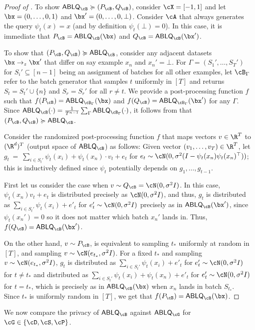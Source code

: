 \documentclass[twoside]{article}
\theoremstyle{definition}
\newcommand{\ABLQ}{\mathsf{ABLQ}}
\newcommand{\ABLQG}{\ABLQ_{\cG}}
\newcommand{\ABLQB}{\ABLQ_{\cB}}
\newcommand{\PB}{P_{\cB}}
\newcommand{\QB}{Q_{\cB}}
\newcommand{\dominates}{\succcurlyeq}%
\begin{document}
\begin{proof}[Proof of ]
To show $\ABLQB \dominates (\PB, \QB)$, consider $\cX = [-1, 1]$ and let $\bx = (0, \ldots, 0, 1)$ and $\bx' = (0, \ldots, 0, \bot)$. Consider
$\cA$ that always generates the query $\psi_t(x) = x$ (and by definition $\psi_t(\bot) = 0$). In this case, it is immediate that $\PB = \ABLQB(\bx)$ and $\QB = \ABLQB(\bx')$.

To show that $(\PB, \QB) \dominates \ABLQB$, consider any adjacent datasets $\bx \to_z \bx'$ that differ on say example $x_n$ and $x_n' = \bot$.
For $\Gamma = (S_1', \ldots, S_T')$ for $S_i' \subseteq [n-1]$ being an assignment of batches for all other examples, let $\cB_{\Gamma}$ refer to the batch generator that samples $t$ uniformly in $[T]$ and returns $S_t = S_t' \cup \{n\}$ and $S_{r} = S_r'$ for all $r \ne t$.
We provide a post-processing function $f$ such that $f(\PB) = \ABLQ_{\cB_{\Gamma}}(\bx)$ and $f(\QB) = \ABLQ_{\cB_{\Gamma}}(\bx')$ for any $\Gamma$.
Since $\ABLQB(\cdot) = \frac{1}{T^{n-1}}\sum_{\Gamma} \ABLQ_{\cB_\Gamma}(\cdot)$, it follows from  that $(\PB, \QB) \dominates \ABLQB$.

Consider the randomized post-processing function $f$ that maps vectors $v \in \R^T$ to $(\R^d)^T$ (output space of $\ABLQB$) as follows: Given vector $(v_1, \ldots, v_T) \in \R^T$, let $g_t ~=~ \sum_{i \in S_t'} \psi_t(x_i) + \psi_t(x_n) \cdot v_t + e_t$
for $e_t \sim \cN(0, \sigma^2 (I - \psi_t(x_n) \psi_t(x_n)^\top))$; this is inductively defined since $\psi_t$ potentially depends on $g_1, \ldots, g_{t-1}$.

First let us consider the case when $v \sim \QB = \cN(0, \sigma^2 I)$. In this case, $\psi_t(x_n) v_t + e_t$ is distributed precisely as $\cN(0, \sigma^2 I)$, and thus, $g_t$ is distributed as $\sum_{i \in S_t'} \psi_t(x_i) + e'_t$ for $e'_t \sim \cN(0, \sigma^2 I)$ precisely as in $\ABLQB(\bx')$, since $\psi_t(x_n') = 0$ so it does not matter which batch $x_n'$ lands in. Thus, $f(\QB) = \ABLQB(\bx')$.

On the other hand, $v \sim \PB$, is equivalent to sampling $t_*$ uniformly at random in $[T]$, and sampling $v \sim \cN(e_{t_*}, \sigma^2 I)$. For a fixed $t_*$ and sampling $v \sim \cN(e_{t_*}, \sigma^2 I)$, $g_t$ is distributed as $\sum_{i \in S_t'} \psi_t(x_i) + e'_t$ for $e'_t \sim \cN(0, \sigma^2 I)$ for $t \ne t_*$ and distributed as $\sum_{i \in S_t'} \psi_t(x_i) + \psi_t(x_n) + e'_t$ for $e'_t \sim \cN(0, \sigma^2 I)$ for $t = t_*$, which is precisely as in $\ABLQB(\bx)$ when $x_n$ lands in batch $S_{t_*}$. Since $t_*$ is uniformly random in $[T]$,
we get that $f(\PB) = \ABLQB(\bx)$.
\end{proof}
We now compare the privacy of $\ABLQB$ against $\ABLQG$ for $\cG \in \{\cD, \cS, \cP\}$.
\end{document}
